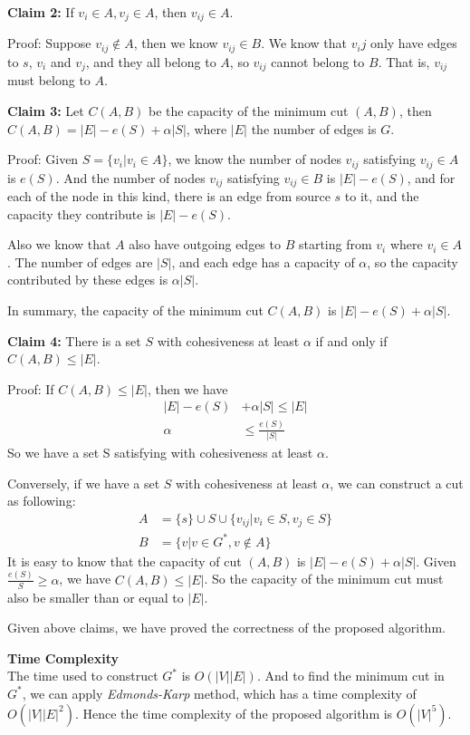 \documentclass{article}
\newcommand{\Complexity}{\vspace{0.3cm} \noindent\textbf{Time Complexity} \\}
\begin{document}
\textbf{Claim 2:} If $v_i \in A, v_j \in A$, then $v_{ij} \in A$.

Proof: Suppose $v_{ij} \notin A$, then we know $v_{ij} \in B$. We know that $v_ij$ only have edges
to $s$, $v_i$ and $v_j$, and they all belong to $A$, so $v_{ij}$ cannot belong to $B$. That is,
$v_{ij}$ must belong to $A$. 

\textbf{Claim 3:} Let $C(A, B)$ be the capacity of the minimum cut $(A,B)$, then $C(A, B) = |E| -
e(S) + \alpha|S|$, where $|E|$ the number of edges is $G$. 

Proof: Given $S = \{v_i | v_i \in A \}$, we know the number of nodes $v_{ij}$ satisfying $v_{ij} \in A$ is
$e(S)$. And the number of nodes $v_{ij}$ satisfying  $v_{ij}\in B$ is $|E| - e(S)$, and for each
of the node in this kind, there is an edge from source $s$ to it, and the capacity they contribute
is $|E| - e(S)$. 

Also we know that $A$ also have outgoing edges to $B$ starting from $v_i$ where $v_i \in A$. 
The number of edges are $|S|$, and each edge has a capacity of $\alpha$, so
the capacity contributed by these edges is $\alpha|S|$. 

In summary, the capacity of the minimum cut $C(A, B)$ is $|E| - e(S) + \alpha |S|$.

\textbf{Claim 4:} 
There is a set $S$ with cohesiveness at least $\alpha$ if and only if $C(A, B) \leq |E|$.

Proof: If $C(A, B) \leq |E|$, then we have
\begin{align}
    |E| - e(S) & + \alpha |S|  \leq |E| \\
    \alpha & \leq \frac{e(S)}{|S|} 
\end{align}
So we have a set S satisfying with cohesiveness at least $\alpha$.

Conversely, if we have a set $S$ with cohesiveness at least $\alpha$, we can construct a cut as
following:
\begin{align}
  A & = \{s\} \cup S \cup \{v_{ij}  | v_i \in S, v_j \in S \} \\
  B & = \{v | v \in G^*, v \notin A\}
\end{align}
It is easy to know that the capacity of cut $(A, B)$ is $|E| - e(S) + \alpha |S|$. Given
$\frac{e(S)}{S} \geq \alpha$, we have $C(A, B) \leq |E|$. So the capacity of the minimum cut must
also be smaller than or equal to $|E|$.

Given above claims, we have proved the correctness of the proposed algorithm.

\Complexity
The time used to construct $G^*$ is $O(|V||E|)$. And to find the minimum cut in $G^*$, we can
apply \textit{Edmonds-Karp} method, which has a time complexity of $O(|V||E|^2)$. Hence the time
complexity of the proposed algorithm is $O(|V|^5)$.
\end{document}
